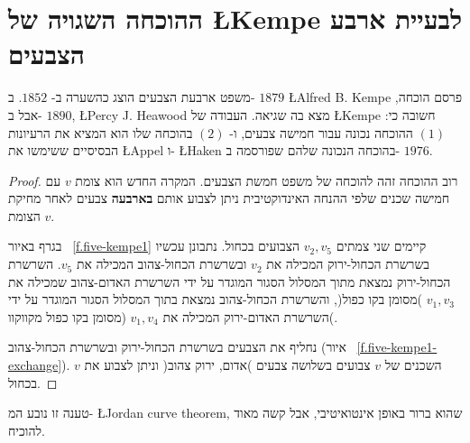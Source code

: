 
\section{ההוכחה השגויה של
\L{Kempe}
לבעיית ארבע הצבעים}
\label{s.kempe}

משפט ארבעת הצבעים הוצג כהשערה ב-%
$1852$.
ב-%
$1879$
\L{Alfred B. Kempe}
פרסם הוכחה, אבל ב-%
$1890$,
\L{Percy J. Heawood}
מצא בה שגיאה. העבודה של
\L{Kempe}
חשובה כי: 
$(1)$
ההוכחה נכונה עבור חמישה צבעים, ו-%
$(2)$
בהוכחה שלו הוא המציא את הרעיונות הבסיסיים ששימשו את
\L{Appel}
ו-%
\L{Haken}
בהוכחה הנכונה שלהם שפורסמה ב-%
$1976$.

\begin{proof}
רוב ההוכחה זהה להוכחה של משפט חמשת הצבעים. המקרה החדש הוא צומת 
$v$
עם חמישה שכנים שלפי ההנחה האינדוקטיבית ניתן לצבוע אותם
\textbf{בארבעה}
צבעים לאחר מחיקת הצומת
$v$.

בגרף באיור %
~\ref{f.five-kempe1}
קיימים שני צמתים
$v_2,v_5$
הצבועים בכחול. נתבונן עכשיו בשרשרת הכחול-ירוק המכילה את 
$v_2$
ובשרשרת הכחול-צהוב המכילה את
$v_5$.
השרשרת הכחול-ירוק נמצאת מתוך המסלול הסגור המוגדר על ידי השרשרת האדום-צהוב שמכילה את
$v_1,v_3$
)מסומן בקו כפול(,
והשרשרת הכחול-צהוב נמצאת בתוך המסלול הסגור המוגדר על ידי השרשרת האדום-ירוק המכילה את
$v_1,v_4$
(מסומן בקו כפול מקווקוו(.

נחליף את הצבעים בשרשרת הכחול-ירוק ובשרשרת הכחול-צהוב (איור%
~\ref{f.five-kempe1-exchange}).
השכנים של
$v$
צבועים בשלושה צבעים )אדום, ירוק צהוב( וניתן לצבוע את
$v$
בכחול.
\end{proof}


\begin{advanced}
טענה זו נובע המ-%
\L{Jordan curve theorem},
שהוא ברור באופן אינטואיטיבי, אבל קשה מאוד להוכיח.
\end{advanced}

